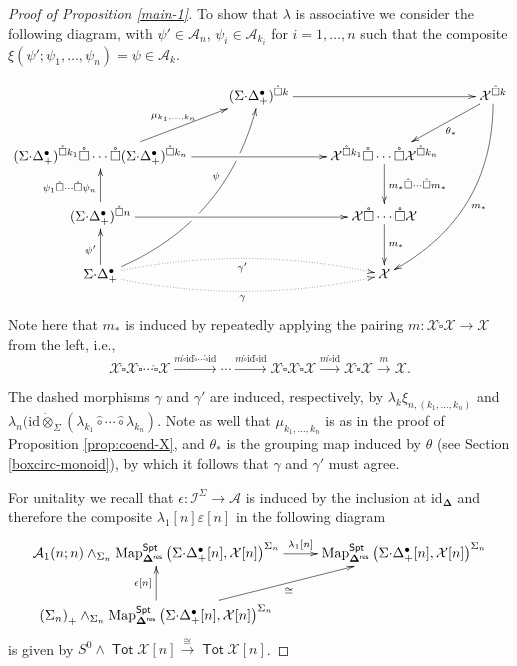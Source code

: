 \documentclass[11pt]{amsart}
\theoremstyle{definition}
\theoremstyle{remark}
\newcommand{\Spt}{\mathsf{Spt}}
\newcommand{\Tot}{\operatorname{\mathsf{Tot}}}
\newcommand{\Map}{\operatorname{Map}}
\newcommand{\id}{\mathrm{id}}
\newcommand{\Cal}[1]{\mathcal{#1}}
\newcommand{\circhat}{\hat{\circ}}
\newcommand{\tensordot}{\dot{\otimes}}
\newcommand{\boxcirc}{\mathring{\square}}
\newcommand{\Isym}{\Cal{I}^{\Sigma}}
\newcommand{\SD}{\Sigma{\cdot}\Delta^{\bullet}}
\newcommand{\bdel}{\mathbf{\Delta}}
\newcommand{\Dres}{\bdel^{\mathsf{res}}}
\begin{document}
\begin{proof}[Proof of Proposition \ref{main-1}]
To show that $\lambda$ is associative we consider the following diagram, with $\psi'\in \Cal{A}_n$, $\psi_i \in \Cal{A}_{k_i}$ for $i=1,\dots,n$ such that the composite $\xi(\psi';\psi_1,\dots,\psi_n)=\psi \in \Cal{A}_k$. 

\[ \xymatrix{
    &(\SD_+)^{\boxcirc k} \ar[rr]%
    &&
    \Cal{X}^{\boxcirc k} \ar[dl]^-{\theta_*} \ar@/^2pc/[dddl]^{m_*}
    \\
    (\SD_+)^{\boxcirc k_1} \boxcirc \cdots \boxcirc (\SD_+)^{\boxcirc k_n} \ar[ur]^-{\mu_{k_1,\dots,k_n}} \ar[rr]%
        &&
    {\Cal{X}^{\boxcirc k_1}\boxcirc \cdots \boxcirc \Cal{X}^{\boxcirc k_n}}  \ar[d]^-{m_*\boxcirc \cdots \boxcirc m_*} &
    \\ 
    (\SD_+)^{\boxcirc n} \ar[u]^{\psi_1\boxcirc \cdots \boxcirc\psi_n} \ar[rr]%
    &&
    \Cal{X}\boxcirc \cdots \boxcirc \Cal{X} \ar[d]^-{m_*} &
    \\ 
    \SD_+ \ar[u]^<(.3){\psi'} \ar@{.>}@/^1pc/[rr]_{\gamma'} \ar@{.>}@/_1pc/[rr]_{\gamma} \ar@/_2pc/[uuur]|!{[u];[ur]}\hole|!{[uu];[uur]}\hole^<(.6){\psi}  
    &&
    \Cal{X}
    }\]
Note here that $m_*$ is induced by repeatedly applying the pairing $m\colon \Cal{X}\boxcirc \Cal{X}\to\Cal{X}$ from the left, i.e., \[ \Cal{X}\boxcirc \Cal{X} \boxcirc \cdots \boxcirc \Cal{X} \xrightarrow{m\boxcirc \id\boxcirc \cdots \boxcirc \id} \cdots \xrightarrow{m\boxcirc \id\boxcirc\id} \Cal{X} \boxcirc \Cal{X} \boxcirc \Cal{X} \xrightarrow{m\boxcirc \id}\Cal{X} \boxcirc \Cal{X} \xrightarrow{m} \Cal{X}.\] 

The dashed morphisms $\gamma$ and $\gamma'$ are induced, respectively, by  $\lambda_k \xi_{n,(k_1,\dots,k_n)}$ and $\lambda_n (\id \tensordot_{\Sigma} (\lambda_{k_1} \circhat \cdots \circhat \lambda_{k_n})$. Note as well that $\mu_{k_1,\dots,k_n}$ is as in the proof of Proposition \ref{prop:coend-X}, and $\theta_*$ is the grouping map induced by $\theta$ (see Section \ref{boxcirc-monoid}), by which it follows that $\gamma$ and $\gamma'$ must agree. 

For unitality we recall that  $\epsilon\colon \Isym\to \Cal{A}$ is induced by the inclusion at $\id_{\bdel}$ and therefore the composite $\lambda_1[n]\varepsilon[n]$ in the following diagram \[
\xymatrix{
    \Cal{A}_1(n;n) \wedge_{\Sigma_n} \Map_{\Dres}^{\Spt} \left(\SD_+[n],\Cal{X}[n]\right)^{\Sigma_n}
    \ar[r]^-{\lambda_1[n]} & \Map_{\Dres}^{\Spt}\left(\SD_+[n],\Cal{X}[n]\right)^{\Sigma_n}
    \\ 
    \left( \Sigma_n \right)_+ \wedge_{\Sigma_n} \Map_{\Dres}^{\Spt}\left(\SD_+[n],\Cal{X}[n]\right)^{\Sigma_n}
    \ar[u]^-{\epsilon[n]} \ar[ru]_-{\cong}  &
}\]
is given by $S^0\wedge \Tot \Cal{X}[n]\xrightarrow{\cong} \Tot \Cal{X}[n]$.
\end{proof}
\end{document}
